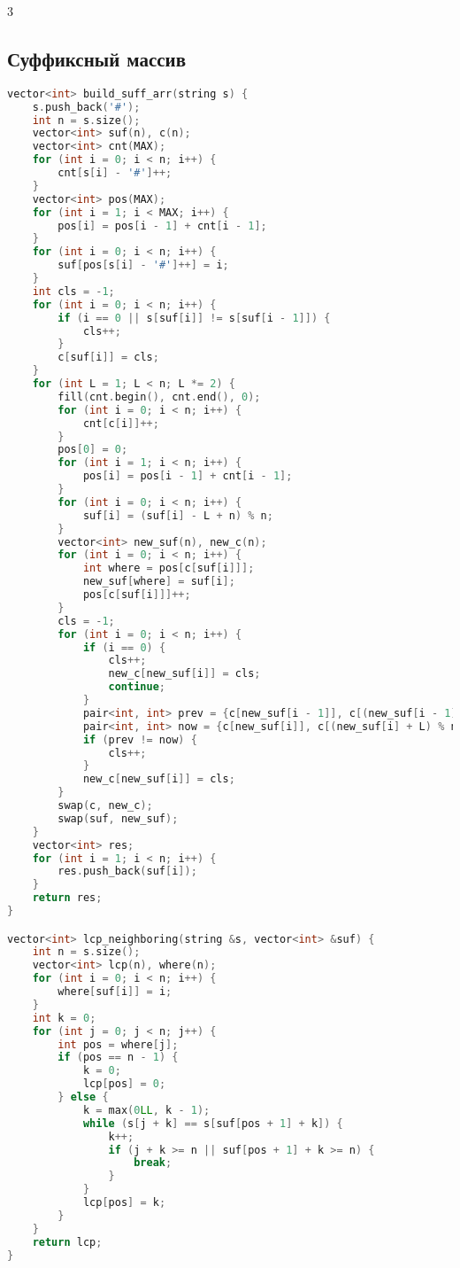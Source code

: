\documentclass[10pt,a4paper,landscape,twosided]{extarticle}
\begin{document}
\begin{multicols}{3}
\subsection{Суффиксный массив}
\begin{lstlisting}[language=C++]
vector<int> build_suff_arr(string s) {
    s.push_back('#');
    int n = s.size();
    vector<int> suf(n), c(n);
    vector<int> cnt(MAX);
    for (int i = 0; i < n; i++) {
        cnt[s[i] - '#']++;
    }
    vector<int> pos(MAX);
    for (int i = 1; i < MAX; i++) {
        pos[i] = pos[i - 1] + cnt[i - 1];
    }
    for (int i = 0; i < n; i++) {
        suf[pos[s[i] - '#']++] = i;
    }
    int cls = -1;
    for (int i = 0; i < n; i++) {
        if (i == 0 || s[suf[i]] != s[suf[i - 1]]) {
            cls++;
        }
        c[suf[i]] = cls;
    }
    for (int L = 1; L < n; L *= 2) {
        fill(cnt.begin(), cnt.end(), 0);
        for (int i = 0; i < n; i++) {
            cnt[c[i]]++;
        }
        pos[0] = 0;
        for (int i = 1; i < n; i++) {
            pos[i] = pos[i - 1] + cnt[i - 1];
        }
        for (int i = 0; i < n; i++) {
            suf[i] = (suf[i] - L + n) % n;
        }
        vector<int> new_suf(n), new_c(n);
        for (int i = 0; i < n; i++) {
            int where = pos[c[suf[i]]];
            new_suf[where] = suf[i];
            pos[c[suf[i]]]++;
        }
        cls = -1;
        for (int i = 0; i < n; i++) {
            if (i == 0) {
                cls++;
                new_c[new_suf[i]] = cls;
                continue;
            }
            pair<int, int> prev = {c[new_suf[i - 1]], c[(new_suf[i - 1] + L) % n]};
            pair<int, int> now = {c[new_suf[i]], c[(new_suf[i] + L) % n]};
            if (prev != now) {
                cls++;
            }
            new_c[new_suf[i]] = cls;
        }
        swap(c, new_c);
        swap(suf, new_suf);
    }
    vector<int> res;
    for (int i = 1; i < n; i++) {
        res.push_back(suf[i]);
    }
    return res;
}

vector<int> lcp_neighboring(string &s, vector<int> &suf) {
    int n = s.size();
    vector<int> lcp(n), where(n);
    for (int i = 0; i < n; i++) {
        where[suf[i]] = i;
    }
    int k = 0;
    for (int j = 0; j < n; j++) {
        int pos = where[j];
        if (pos == n - 1) {
            k = 0;
            lcp[pos] = 0;
        } else {
            k = max(0LL, k - 1);
            while (s[j + k] == s[suf[pos + 1] + k]) {
                k++;
                if (j + k >= n || suf[pos + 1] + k >= n) {
                    break;
                }
            }
            lcp[pos] = k;
        }
    }
    return lcp;
}


\end{lstlisting}
\end{multicols}
\end{document}
